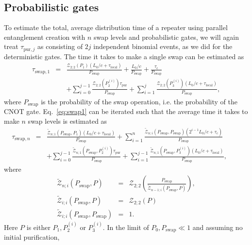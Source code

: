 \subsection{Probabilistic gates}

To estimate the total, average distribution time of a repeater using parallel
entanglement creation with $n$ swap levels and probabilistic gates, we will
again treat $\tau_{\text{pur},j}$ as consisting of $2j$ independent binomial
events, as we did for the deterministic gates. The time it takes to make a
single swap can be estimated as
\begin{eqnarray} \label{eq:swap1}
\tau_{\text{swap},1}&=&\frac{\mathcal{Z}_{2;2}
(P_{1})(L_{0}/c+\tau_{\text{local}})}{P_{\text{swap}}}+
\frac{L_{0}/c}{P_{\text{swap}}}+\frac{\tau_{\text{c}}}{P_{\text{swap}}} \nonumber \\
&&+\sum_{i=0}^{j-1}\frac{\mathcal{Z}_{2;2}
(P_{2}^{(i)})\tau_{\text{pur}}}{P_{\text{swap}}} +\sum_{i=1}^{j}\frac{\mathcal{Z}_{2;2}(P_{3}^{(i)})
(L_{0}/c+\tau_{\text{local}})}{P_{\text{swap}}},
\end{eqnarray}
where $P_{\text{swap}}$ is the probability of the swap operation, i.e. the
probability of the CNOT gate. Eq.~\eqref{eq:swap1} can be iterated such that the
average time it takes to make $n$ swap levels is estimated as
\begin{eqnarray} \label{eq:swap2}
\tau_{\text{swap},n}&=&\frac{\tilde{\mathcal{Z}}_{n;1}
(P_{\text{swap}},P_{1})(L_{0}/c+\tau_{\text{local}})}{P_{\text{swap}}} +\sum_{i=1}^{n}\frac{\tilde{\mathcal{Z}}_{n;i}
(P_{\text{swap}},P_{\text{swap}})(2^{i-1}L_{0}/c+\tau_{\text{c}})}
{P_{\text{swap}}} \nonumber \\
&&+\sum_{i=0}^{j-1}\frac{\tilde{\mathcal{Z}}_{n;1}
(P_{\text{swap}},P_{2}^{(i)})\tau_{\text{pur}}}{P_{\text{swap}}} +\sum_{i=1}^{j-1}\frac{\tilde{\mathcal{Z}}_{n;1}
(P_{\text{swap}},P_{3}^{(i)})(L_{0}/c+\tau_{\text{local}})}{P_{\text{swap}}}, \qquad
\end{eqnarray}
where 
\begin{eqnarray}
\tilde{\mathcal{Z}}_{n;i}(P_{\text{swap}},P)
&=&\mathcal{Z}_{2;2}\left(\frac{P_{\text{swap}}}
{\tilde{\mathcal{Z}}_{n-1;i}(P_{\text{swap}},P)}\right), \\ 
\tilde{\mathcal{Z}}_{i;i}(P_{\text{swap}},P)&=&\mathcal{Z}_{2;2}(P) \\
\tilde{\mathcal{Z}}_{i;i}(P_{\text{swap}},P_{\text{swap}})&=&1.
\end{eqnarray}
Here $P$ is either $P_{1}, P_{2}^{(i)}$ or $P_{3}^{(i)}$. In the limit of
$P_{0},P_{\text{swap}}\ll1$ and assuming no initial purification,
